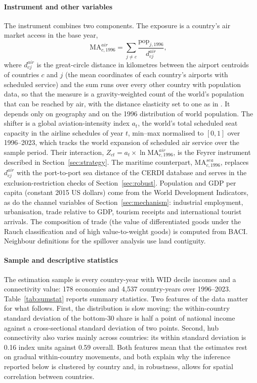 \paragraph{Instrument and other variables}
The instrument combines two components. The exposure is a country's air market access in the base year,
\begin{equation}
\mathrm{MA}^{air}_{c,1996} = \sum_{j \neq c} \frac{\mathrm{pop}_{j,1996}}{d^{air}_{cj}},
\label{eq:ma}
\end{equation}
where $d^{air}_{cj}$ is the great-circle distance in kilometres between the airport centroids of countries $c$ and $j$ (the mean coordinates of each country's airports with scheduled service) and the sum runs over every other country with population data, so that the measure is a gravity-weighted count of the world's population that can be reached by air, with the distance elasticity set to one as in \citet{Feyrer_2019}. It depends only on geography and on the 1996 distribution of world population. The shifter is a global aviation-intensity index $a_t$, the world's total scheduled seat capacity in the airline schedules of year $t$, min--max normalised to $[0,1]$ over 1996--2023, which tracks the world expansion of scheduled air service over the sample period. Their interaction, $Z_{ct}=a_t\times\ln\mathrm{MA}^{air}_{c,1996}$, is the Feyrer instrument described in Section~\ref{sec:strategy}. The maritime counterpart, $\mathrm{MA}^{sea}_{c,1996}$, replaces $d^{air}_{cj}$ with the port-to-port sea distance of the CERDI database and serves in the exclusion-restriction checks of Section~\ref{sec:robust}. Population and GDP per capita (constant 2015 US dollars) come from the World Development Indicators, as do the channel variables of Section~\ref{sec:mechanism}: industrial employment, urbanisation, trade relative to GDP, tourism receipts and international tourist arrivals. The composition of trade (the value of differentiated goods under the Rauch classification and of high value-to-weight goods) is computed from BACI. Neighbour definitions for the spillover analysis use land contiguity.

\paragraph{Sample and descriptive statistics}
The estimation sample is every country-year with WID decile incomes and a connectivity value: 178 economies and 4{,}537 country-years over 1996--2023. Table~\ref{tab:sumstat} reports summary statistics. Two features of the data matter for what follows. First, the distribution is slow moving: the within-country standard deviation of the bottom-30 share is half a point of national income against a cross-sectional standard deviation of two points. Second, hub connectivity also varies mainly across countries: its within standard deviation is 0.16 index units against 0.59 overall. Both features mean that the estimates rest on gradual within-country movements, and both explain why the inference reported below is clustered by country and, in robustness, allows for spatial correlation between countries.

